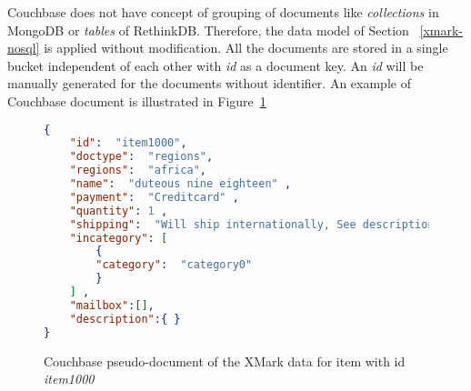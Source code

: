 
Couchbase does not have concept of grouping of documents like \textit{collections} in MongoDB  or \textit{tables} of RethinkDB. Therefore, the data model of Section ~\ref{xmark-nosql} is applied without modification. All the documents are stored in a single bucket independent of each other with \textit{id} as a document key. An \textit{id} will be manually generated for the documents without identifier.
 An example of Couchbase document is illustrated in Figure~\ref{code:couchbase-item0}

\begin{figure}
\begin{lstlisting}[language=JSON,  basicstyle =\scriptsize]
{
	"id":  "item1000",
	"doctype":  "regions",
	"regions":  "africa",
	"name":  "duteous nine eighteen" ,
	"payment":  "Creditcard" ,
	"quantity": 1 ,
	"shipping":  "Will ship internationally, See description for charges" ,
	"incategory": [
		{
		"category":  "category0"
		}
	] ,
	"mailbox":[],
	"description":{ }
}
\end{lstlisting} 
\caption{Couchbase pseudo-document of the XMark data for item with id \textit{item1000}}
\label{code:couchbase-item0}
\end{figure}